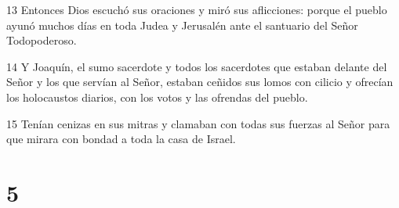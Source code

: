 \par 13 Entonces Dios escuchó sus oraciones y miró sus aflicciones: porque el pueblo ayunó muchos días en toda Judea y Jerusalén ante el santuario del Señor Todopoderoso.
\par 14 Y Joaquín, el sumo sacerdote y todos los sacerdotes que estaban delante del Señor y los que servían al Señor, estaban ceñidos sus lomos con cilicio y ofrecían los holocaustos diarios, con los votos y las ofrendas del pueblo.
\par 15 Tenían cenizas en sus mitras y clamaban con todas sus fuerzas al Señor para que mirara con bondad a toda la casa de Israel.

\chapter{5}

